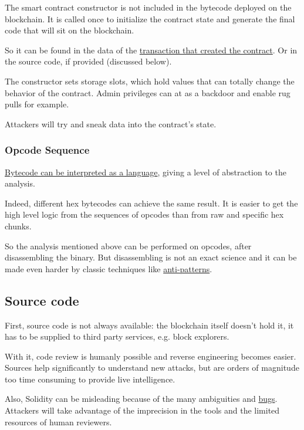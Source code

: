 The smart contract constructor is not included in the bytecode deployed on the blockchain.
It is called once to initialize the contract state and generate the final code that will sit on the blockchain.

So it can be found in the data of the \href{https://etherscan.io/tx/0xd66169d4a5feaceaf777b9949ad0e9bc5621a438846a90087e50a5d7b9b0ad1e}{transaction that created the contract}.
Or in the source code, if provided (discussed below).

The constructor sets storage slots, which hold values that can totally change the behavior of the contract.
Admin privileges can at as a backdoor and enable rug pulls for example.

Attackers will try and sneak data into the contract's state.

\subsubsection{Opcode Sequence}

\href{\urlcodeevmdasm}{Bytecode can be interpreted as a language}, giving a level of abstraction to the analysis.

Indeed, different hex bytecodes can achieve the same result.
It is easier to get the high level logic from the sequences of opcodes than from raw and specific hex chunks.

So the analysis mentioned above can be performed on opcodes, after disassembling the binary.
But disassembling is not an exact science and it can be made even harder by classic techniques like \href{\urlpapereshield}{anti-patterns}.

\subsection{Source code}

First, source code is not always available: the blockchain itself doesn't hold it, it has to be supplied to third party services, e.g. block explorers.

With it, code review is humanly possible and reverse engineering becomes easier.
Sources help significantly to understand new attacks, but are orders of magnitude too time consuming to provide live intelligence.

Also, Solidity can be misleading because of the many ambiguities and \href{\urldocssoliditybugs}{bugs}.
Attackers will take advantage of the imprecision in the tools and the limited resources of human reviewers.
